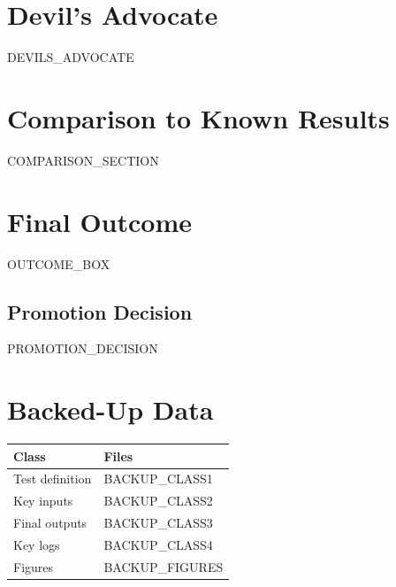 \documentclass[11pt,a4paper]{article}
\begin{document}
\section{Devil's Advocate}

\begin{warnbox}
{{DEVILS_ADVOCATE}}
\end{warnbox}


\section{Comparison to Known Results}

{{COMPARISON_SECTION}}


\section{Final Outcome}

{{OUTCOME_BOX}}

\subsection{Promotion Decision}

{{PROMOTION_DECISION}}


\section{Backed-Up Data}

\begin{infobox}
\begin{tabularx}{\linewidth}{@{}>{\raggedright\arraybackslash}p{3.5cm} >{\raggedright\arraybackslash}X@{}}
\toprule
\textbf{Class} & \textbf{Files} \\
\midrule
Test definition  & {{BACKUP_CLASS1}} \\
Key inputs       & {{BACKUP_CLASS2}} \\
Final outputs    & {{BACKUP_CLASS3}} \\
Key logs         & {{BACKUP_CLASS4}} \\
Figures          & {{BACKUP_FIGURES}} \\
\bottomrule
\end{tabularx}
\end{infobox}
\end{document}
